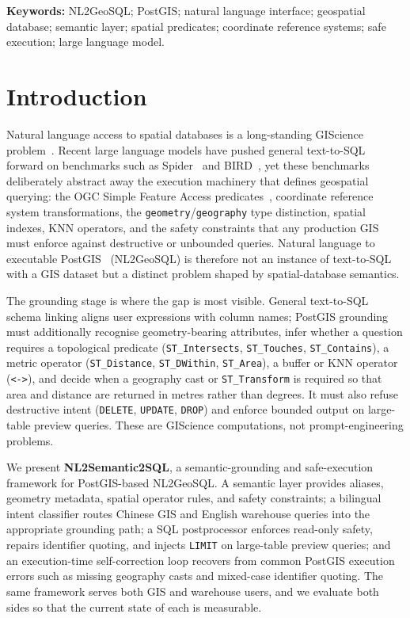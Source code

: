 \documentclass[11pt]{article}
\begin{document}
\noindent\textbf{Keywords:} NL2GeoSQL; PostGIS; natural language interface; geospatial database; semantic layer; spatial predicates; coordinate reference systems; safe execution; large language model.

\section{Introduction}
\label{sec:intro}

Natural language access to spatial databases is a long-standing GIScience problem~\cite{goodchild1992gis,egenhofer1991topological,clementini1993small}. Recent large language models have pushed general text-to-SQL forward on benchmarks such as Spider~\cite{yu2018spider} and BIRD~\cite{li2023bird}, yet these benchmarks deliberately abstract away the execution machinery that defines geospatial querying: the OGC Simple Feature Access predicates~\cite{ogcsfs}, coordinate reference system transformations, the \texttt{geometry}/\texttt{geography} type distinction, spatial indexes, KNN operators, and the safety constraints that any production GIS must enforce against destructive or unbounded queries. Natural language to executable PostGIS~\cite{postgis} (NL2GeoSQL) is therefore not an instance of text-to-SQL with a GIS dataset but a distinct problem shaped by spatial-database semantics.

The grounding stage is where the gap is most visible. General text-to-SQL schema linking aligns user expressions with column names; PostGIS grounding must additionally recognise geometry-bearing attributes, infer whether a question requires a topological predicate (\texttt{ST\_Intersects}, \texttt{ST\_Touches}, \texttt{ST\_Contains}), a metric operator (\texttt{ST\_Distance}, \texttt{ST\_DWithin}, \texttt{ST\_Area}), a buffer or KNN operator (\texttt{<->}), and decide when a geography cast or \texttt{ST\_Transform} is required so that area and distance are returned in metres rather than degrees. It must also refuse destructive intent (\texttt{DELETE}, \texttt{UPDATE}, \texttt{DROP}) and enforce bounded output on large-table preview queries. These are GIScience computations, not prompt-engineering problems.

We present \textbf{NL2Semantic2SQL}, a semantic-grounding and safe-execution framework for PostGIS-based NL2GeoSQL. A semantic layer provides aliases, geometry metadata, spatial operator rules, and safety constraints; a bilingual intent classifier routes Chinese GIS and English warehouse queries into the appropriate grounding path; a SQL postprocessor enforces read-only safety, repairs identifier quoting, and injects \texttt{LIMIT} on large-table preview queries; and an execution-time self-correction loop recovers from common PostGIS execution errors such as missing geography casts and mixed-case identifier quoting. The same framework serves both GIS and warehouse users, and we evaluate both sides so that the current state of each is measurable.
\end{document}
